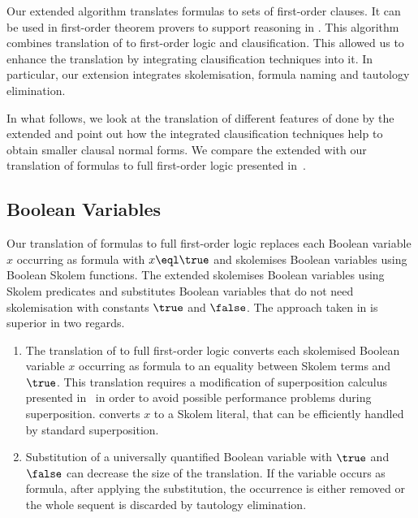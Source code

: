 
Our extended \newcnf{} algorithm translates \folb{} formulas to sets of first-order clauses. It can be used in first-order theorem provers to support reasoning in \folb{}. This algorithm combines translation of \folb{} to first-order logic and clausification. This allowed us to enhance the translation by integrating clausification techniques into it. In particular, our extension integrates skolemisation, formula naming and tautology elimination. 

In what follows, we look at the translation of different features of \folb{} done by the extended \newcnf{} and point out how the integrated clausification techniques help to obtain smaller clausal normal forms. We compare the extended \newcnf{} with our translation of \folb{} formulas to full first-order logic presented in~\cite{FOOL}.

\subsection{Boolean Variables}
Our translation of \folb{} formulas to full first-order logic replaces each Boolean variable $x$ occurring as formula with $x \eql \true$ and skolemises Boolean variables using Boolean Skolem functions. The extended \newcnf{} skolemises Boolean variables using Skolem predicates and substitutes Boolean variables that do not need skolemisation with constants $\true$ and $\false$. The approach taken in \newcnf{} is superior in two regards.
\begin{enumerate}
  \item The translation of \folb{} to full first-order logic converts each skolemised Boolean variable $x$ occurring as formula to an equality between Skolem terms and $\true$. This translation requires a modification of superposition calculus presented in~\cite{FOOL} in order to avoid possible performance problems during superposition. \newcnf{} converts $x$ to a Skolem literal, that can be efficiently handled by standard superposition.  
  \item Substitution of a universally quantified Boolean variable with $\true$ and $\false$ can decrease the size of the translation. If the variable occurs as formula, after applying the substitution, the occurrence is either removed or the whole sequent is discarded by tautology elimination.
\end{enumerate}

